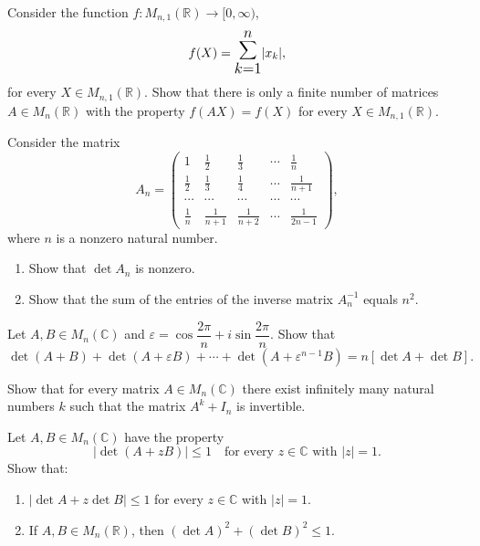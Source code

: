 \documentclass[12pt]{article}
\let\oldsum\sum
\renewcommand{\sum}{\mathlarger{\mathlarger{\oldsum}}}
\begin{document}
\begin{problem}
Consider the function $f : M_{n,1}(\mathbb{R}) \to [0,\infty)$,
$$f(X) = \sum_{k=1}^{n} |x_k|,$$
for every $X \in M_{n,1}(\mathbb{R})$. Show that there is only a finite number of matrices $A \in M_n(\mathbb{R})$ with the property $f(AX) = f(X)$ for every $X \in M_{n,1}(\mathbb{R})$.
\end{problem}

\begin{problem}
Consider the matrix
$$A_n = \begin{pmatrix}
1 & \tfrac{1}{2} & \tfrac{1}{3} & \cdots & \tfrac{1}{n} \\[4pt]
\tfrac{1}{2} & \tfrac{1}{3} & \tfrac{1}{4} & \cdots & \tfrac{1}{n+1} \\[4pt]
\cdots & \cdots & \cdots & \cdots & \cdots \\[4pt]
\tfrac{1}{n} & \tfrac{1}{n+1} & \tfrac{1}{n+2} & \cdots & \tfrac{1}{2n-1}
\end{pmatrix},$$
where $n$ is a nonzero natural number.
\begin{enumerate}[label=\arabic*)]
\item Show that $\det A_n$ is nonzero.
\item Show that the sum of the entries of the inverse matrix $A_n^{-1}$ equals $n^2$.
\end{enumerate}
\end{problem}

\begin{problem}
Let $A, B \in M_n(\mathbb{C})$ and $\varepsilon = \cos\dfrac{2\pi}{n} + i \sin \dfrac{2\pi}{n}$. Show that
$$\det(A+B) + \det(A+\varepsilon B) + \cdots + \det(A + \varepsilon^{n-1} B) = n\left[\det A + \det B\right].$$
\end{problem}

\begin{problem}
Show that for every matrix $A \in M_n(\mathbb{C})$ there exist infinitely many natural numbers $k$ such that the matrix $A^k + I_n$ is invertible.
\end{problem}

\begin{problem}
Let $A, B \in M_n(\mathbb{C})$ have the property
$$|\det(A + zB)| \le 1 \quad \text{for every } z \in \mathbb{C} \text{ with } |z| = 1.$$
Show that:
\begin{enumerate}[label=(\alph*)]
\item $|\det A + z \det B| \le 1$ for every $z \in \mathbb{C}$ with $|z| = 1$.
\item If $A, B \in M_n(\mathbb{R})$, then $(\det A)^2 + (\det B)^2 \le 1$.
\end{enumerate}
\end{problem}
\end{document}
